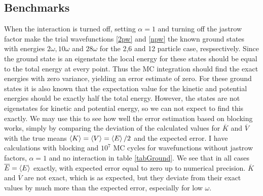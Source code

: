 \documentclass[a4paper,English,10pt]{article}
\renewcommand{\bar}{\overline}
\renewcommand{\braket}{\Braket}
\begin{document}
\subsection{Benchmarks}
When the interaction is turned off, setting $\alpha = 1$ and turning off the jastrow factor make the trial wavefunctions \ref{2pw} and \ref{npw} the known ground states
with energies $2\omega, 10\omega$ and $28\omega$ for the 2,6 and 12 particle case, respsectively. Since the ground state is an eigenstate the local energy for these states
should be equal to the total energy at every point. Thus the MC integration should find the exact energies with zero variance, yielding an error estimate of zero.
For these ground states it is also known that the expectation value for the kinetic and potential energies should be exactly half the total energy. However,
the states are not eigenstates for kinetic and potential energy, so we can not expect to find this exactly. We may use this to see how well the error estimation based
on blocking works, simply by comparing the deviation of the calculated values for $\bar{K}$ and $\bar{V}$ with the true means $\braket{K} = \braket{V} = \braket{E}/2$ and
the expected error. I have calculations with blocking and $10^7$ MC cycles for wavefunctions without jastrow factors, $\alpha = 1$ and no interaction in table \ref{tabGround}. 
We see that in all cases $\bar{E} = \braket{E}$ exactly, with expected error equal to zero up to numerical precision. $\bar{K}$ and $\bar{V}$ are not exact, which is as expected,
but they deviate from their exact values by much more than the expected error, especially for low $\omega$.
\end{document}
